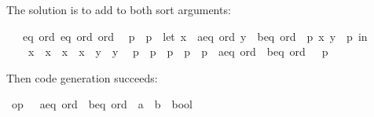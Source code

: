 \begin{isabellebody}
\begin{isamarkuptext}
  The solution is to add  to both sort arguments:%
\end{isamarkuptext}%
\isamarkuptrue%
\isamarkupfalse%
\ {\isacharasterisk}\ {\isacharcolon}{\isacharcolon}\ {\isacharparenleft}{\isachardoublequoteopen}{\isacharbraceleft}eq{\isacharcomma}\ ord{\isacharbraceright}{\isachardoublequoteclose}{\isacharcomma}\ {\isachardoublequoteopen}{\isacharbraceleft}eq{\isacharcomma}\ ord{\isacharbraceright}{\isachardoublequoteclose}{\isacharparenright}\ ord\isanewline
\ \ {\isachardoublequoteopen}p{}\ {\isacharless}\ p{}\ {\isasymequiv}\ let\ {\isacharparenleft}x{}\ {\isasymColon}\ {\isacharprime}a{\isasymColon}{\isacharbraceleft}eq{\isacharcomma}\ ord{\isacharbraceright}{\isacharcomma}\ y{}\ {\isasymColon}\ {\isacharprime}b{\isasymColon}{\isacharbraceleft}eq{\isacharcomma}\ ord{\isacharbraceright}{\isacharparenright}\ {\isacharequal}\ p{}{\isacharsemicolon}\ {\isacharparenleft}x{}{\isacharcomma}\ y{}{\isacharparenright}\ {\isacharequal}\ p{}\ in\isanewline
\ \ \ \ x{}\ {\isacharless}\ x{}\ {\isasymor}\ {\isacharparenleft}x{}\ {\isacharequal}\ x{}\ {\isasymand}\ y{}\ {\isacharless}\ y{}{\isacharparenright}{\isachardoublequoteclose}\isanewline
\ \ {\isachardoublequoteopen}p{}\ {\isasymle}\ p{}\ {\isasymequiv}\ p{}\ {\isacharless}\ p{}\ {\isasymor}\ {\isacharparenleft}p{}\ {\isasymColon}\ {\isacharprime}a{\isasymColon}{\isacharbraceleft}eq{\isacharcomma}\ ord{\isacharbraceright}\ {\isasymtimes}\ {\isacharprime}b{\isasymColon}{\isacharbraceleft}eq{\isacharcomma}\ ord{\isacharbraceright}{\isacharparenright}\ \ {\isacharequal}\ p{}{\isachardoublequoteclose}%
\isadelimproof
\ %
\endisadelimproof
%
\isatagproof
\isacommand{{\isachardot}{\isachardot}}\isamarkupfalse%
%
\endisatagproof
{\isafoldproof}%
%
\isadelimproof
%
\endisadelimproof
%
\begin{isamarkuptext}%
Then code generation succeeds:%
\end{isamarkuptext}%
\isamarkuptrue%
\isamarkupfalse%
\ {\isachardoublequoteopen}op\ {\isasymle}\ {\isasymColon}\ {\isacharprime}a{\isasymColon}{\isacharbraceleft}eq{\isacharcomma}\ ord{\isacharbraceright}\ {\isasymtimes}\ {\isacharprime}b{\isasymColon}{\isacharbraceleft}eq{\isacharcomma}\ ord{\isacharbraceright}\ {\isasymRightarrow}\ {\isacharprime}a\ {\isasymtimes}\ {\isacharprime}b\ {\isasymRightarrow}\ bool{\isachardoublequoteclose}\isanewline

\end{isabellebody}
